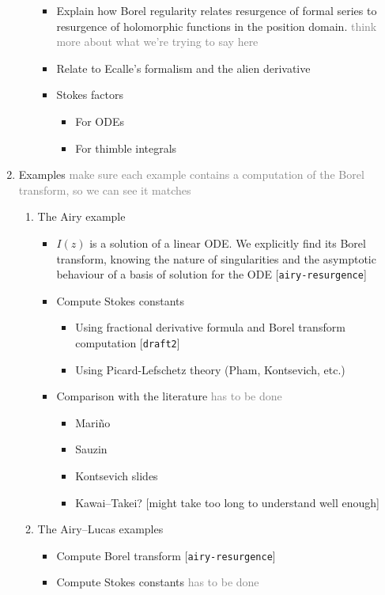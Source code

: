 \documentclass{article}
\begin{document}
\begin{enumerate}
\begin{enumerate}
\begin{itemize}
\item Explain how Borel regularity relates resurgence of formal series to resurgence of holomorphic functions in the position domain. \textcolor{gray}{think more about what we're trying to say here}
\item Relate to Ecalle's formalism and the alien derivative
\item Stokes factors
\begin{itemize}
\item For ODEs
\item For thimble integrals
\end{itemize}
\end{itemize}
\end{enumerate}
\item Examples \textcolor{gray}{make sure each example contains a computation of the Borel transform, so we can see it matches}
\begin{enumerate}
\item The Airy example
\begin{itemize}
\item $I(z)$ is a solution of a linear ODE. We explicitly find its Borel transform, knowing the nature of singularities and the asymptotic behaviour of a basis of solution for the ODE  [{\tt airy-resurgence}]
\item Compute Stokes constants
\begin{itemize}
\item Using fractional derivative formula and Borel transform computation [{\tt draft2}]
\item Using Picard-Lefschetz theory (Pham, Kontsevich, etc.)
\end{itemize}
\item Comparison with the literature \textcolor{gray}{has to be done}
\begin{itemize}
\item Mari\~{n}o
\item Sauzin
\item Kontsevich slides
\item Kawai--Takei? [might take too long to understand well enough]
\end{itemize}
\end{itemize}
\item The Airy--Lucas examples
\begin{itemize}
\item Compute Borel transform [{\tt airy-resurgence}]
\item Compute Stokes constants \textcolor{gray}{has to be done}

\end{itemize}
\end{enumerate}
\end{enumerate}
\end{document}

